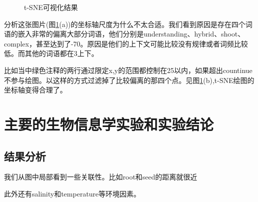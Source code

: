 \documentclass{article}
\begin{document}
\begin{figure}[H]
  \centering
  \caption{t-SNE可视化结果}
  \label{zczxzx}
\end{figure}
分析这张图片(图\ref{zczxzx}(a))的坐标轴尺度为什么不太合适。我们看到原因是存在四个词语的嵌入非常的偏离大部分词语，他们分别是understanding、hybrid、shoot、complex，甚至达到了-70。原因是他们的上下文可能比较没有规律或者词频比较低。而其他的词语都在3上下。\par
比如当中绿色注释的两行通过限定x,y的范围都控制在25以内，如果超出countinue不参与绘图。以这样的方式过滤掉了比较偏离的那四个点。见图\ref{zczxzx}(b),t-SNE绘图的坐标轴变得合理了。
\section{\label{ch:experiment}主要的生物信息学实验和实验结论}
\subsection{结果分析}
我们从图中局部看到一些关联性。比如root和seed的距离就很近\par
此外还有salinity和temperature等环境因素。\par
\end{document}
